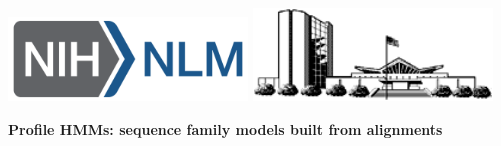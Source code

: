 \documentclass[landscape]{slides}
\begin{document}
\begin{slide}
\begin{center}
\includegraphics[width=2.5in]{figs/NIH_NLM_ABRV_2C_4-white}
\includegraphics[width=2.5in]{figs/nlm-buildings}

\end{center}

\vfill

\end{slide}
\begin{slide}
\begin{center}
\textbf{Profile HMMs: sequence family models built from alignments}
\end{center}



\end{slide}
\end{document}
